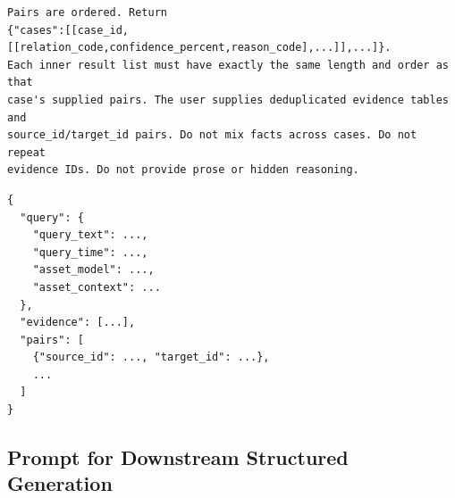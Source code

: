 \begin{lstlisting}
Pairs are ordered. Return
{"cases":[[case_id,[[relation_code,confidence_percent,reason_code],...]],...]}.
Each inner result list must have exactly the same length and order as that
case's supplied pairs. The user supplies deduplicated evidence tables and
source_id/target_id pairs. Do not mix facts across cases. Do not repeat
evidence IDs. Do not provide prose or hidden reasoning.
\end{lstlisting}


\begin{lstlisting}
{
  "query": {
    "query_text": ...,
    "query_time": ...,
    "asset_model": ...,
    "asset_context": ...
  },
  "evidence": [...],
  "pairs": [
    {"source_id": ..., "target_id": ...},
    ...
  ]
}
\end{lstlisting}

\subsection{Prompt for Downstream Structured Generation}
\label{app:generation_prompt}


